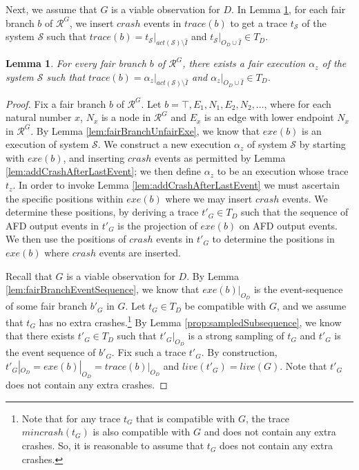 \documentclass[11pt]{article}
\numberwithin{theorem}{section}
\newtheorem{lemma}[theorem]{Lemma}
\begin{document}
Next, we assume that $G$ is a viable observation for $D$. 
In Lemma \ref{lem:fairExe}, for each fair branch $b$ of $\mathcal{R}^G$, we insert $crash$ events in $trace(b)$ to get a trace $t_{\mathcal{S}}$ of the system $\mathcal{S}$ such that $trace(b) =
t_\mathcal{S}|_{act(\mathcal{S}) \setminus \hat{I}}$ and $t_{\mathcal{S}}|_{O_D \cup \hat{I}} \in T_D$.

\begin{lemma}
\label{lem:fairExe}
For every fair branch $b$ of $\mathcal{R}^{G}$, there exists a fair
execution  $\alpha_z$ of the system $\mathcal{S}$ such that $trace(b) = \alpha_z|_{act(\mathcal{S}) \setminus \hat{I}}$ and $\alpha_z|_{O_D \cup \hat{I}} \in T_D$.
\end{lemma}

\begin{proof}
Fix a fair branch $b$ of $\mathcal{R}^{G}$. Let $b = \top,E_1,N_1,E_2,N_2,\ldots$, where for each natural number $x$, $N_x$ is a node in $\mathcal{R}^G$ and $E_x$ is an edge with lower endpoint $N_x$ in $\mathcal{R}^G$.
By Lemma \ref{lem:fairBranchUnfairExe}, we know that $exe(b)$ is an execution of system $\mathcal{S}$. 
We construct a new execution $\alpha_z$ of system $\mathcal{S}$ by starting with $exe(b)$, and inserting $crash$ events as permitted by Lemma \ref{lem:addCrashAfterLastEvent}; we then define $\alpha_z$ to be an execution whose trace $t_z$. In order to invoke Lemma \ref{lem:addCrashAfterLastEvent} we must ascertain the specific positions within $exe(b)$ where we may insert $crash$ events. We determine these positions, by deriving a trace $t'_G \in T_D$ such that the sequence of AFD output events in $t'_G$ is the projection of $exe(b)$ on AFD output events. We then use the positions of $crash$ events in $t'_G$ to determine the positions in $exe(b)$ where $crash$ events are inserted.

Recall that $G$ is a viable observation for $D$. By Lemma \ref{lem:fairBranchEventSequence}, we know that $exe(b)|_{O_D}$ is the event-sequence of some fair branch $b'_G$ in $G$. Let $t_G \in T_D$ be compatible with $G$, and we assume that $t_G$ has no extra crashes.\footnote{Note that for any trace $t_G$ that is compatible with $G$, the trace $mincrash(t_G)$ is also compatible with $G$ and does not contain any extra crashes. So, it is reasonable to assume that $t_G$ does not contain any extra crashes.}
By Lemma \ref{prop:sampledSubsequence}, we know that there exists $t'_G \in T_D$ such that $t'_G|_{O_D}$ is a strong sampling of $t_G$ and $t'_G$ is the event sequence of $b'_G$. Fix such a trace $t'_G$. By construction, $t'_G|_{O_D} = exe(b)|_{O_D} = trace(b)|_{O_D}$ and $live(t'_G) = live(G)$. Note that $t'_G$ does not contain any extra crashes.


\end{proof}
\end{document}
